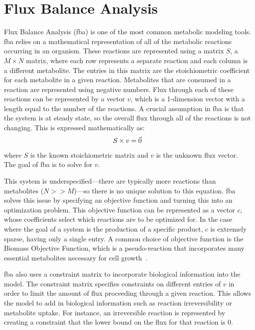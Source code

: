 \section{Flux Balance Analysis}
Flux Balance Analysis (\gls{fba}) is one of the most common metabolic modeling tools.
\gls{fba} relies on a mathematical representation of all of the metabolic reactions occurring in an organism.
These reactions are represented using a matrix $S$, a $M \times N$ matrix, where each row represents a separate reaction and each column is a different metabolite.
The entries in this matrix are the stoichiometric coefficient for each metabolite in a given reaction.
Metabolites that are consumed in a reaction are represented using negative numbers.
Flux through each of these reactions can be represented by a vector $v$, which is a 1-dimension vector with a length equal to the number of the reactions.
A crucial assumption in \gls{fba} is that the system is at steady state, so the overall flux through all of the reactions is not changing.
This is expressed mathematically as:
\begin{equation}
S \times v = \vec{0} \\
\end{equation}
where $S$ is the known stoichiometric matrix and $v$ is the unknown flux vector.
The goal of \gls{fba} is to solve for $v$.

This system is underspecified---there are typically more reactions than metabolites ($N >> M$)---so there is no unique solution to this equation.
\gls{fba} solves this issue by specifying an objective function and turning this into an optimization problem.
This objective function can be represented as a vector $c$, whose coefficients select which reactions are to be optimized for.
In the case where the goal of a system is the production of a specific product, $c$ is extremely sparse, having only a single entry.
A common choice of objective function is the Biomass Objective Function, which is a pseudo-reaction that incorporates many essential metabolites necessary for cell growth~\cite{feist2010biomass}.

\gls{fba} also uses a constraint matrix to incorporate biological information into the model.
The constraint matrix specifies constraints on different entries of $v$ in order to limit the amount of flux proceeding through a given reaction.
This allows the model to add in biological information such as reaction irreversibility or metabolite uptake.
For instance, an irreversible reaction is represented by creating a constraint that the lower bound on the flux for that reaction is 0.

